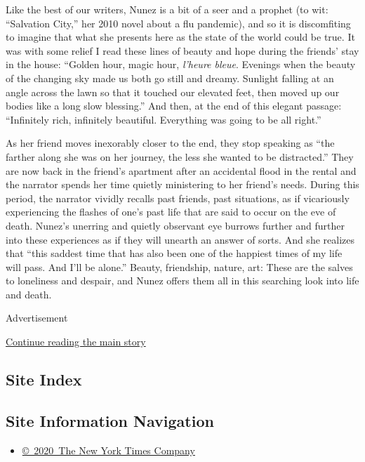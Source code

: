 Like the best of our writers, Nunez is a bit of a seer and a prophet (to
wit: ``Salvation City,'' her 2010 novel about a flu pandemic), and so it
is discomfiting to imagine that what she presents here as the state of
the world could be true. It was with some relief I read these lines of
beauty and hope during the friends' stay in the house: ``Golden hour,
magic hour, \emph{l'heure bleue}. Evenings when the beauty of the
changing sky made us both go still and dreamy. Sunlight falling at an
angle across the lawn so that it touched our elevated feet, then moved
up our bodies like a long slow blessing.'' And then, at the end of this
elegant passage: ``Infinitely rich, infinitely beautiful. Everything was
going to be all right.''

As her friend moves inexorably closer to the end, they stop speaking as
``the farther along she was on her journey, the less she wanted to be
distracted.'' They are now back in the friend's apartment after an
accidental flood in the rental and the narrator spends her time quietly
ministering to her friend's needs. During this period, the narrator
vividly recalls past friends, past situations, as if vicariously
experiencing the flashes of one's past life that are said to occur on
the eve of death. Nunez's unerring and quietly observant eye burrows
further and further into these experiences as if they will unearth an
answer of sorts. And she realizes that ``this saddest time that has also
been one of the happiest times of my life will pass. And I'll be
alone.'' Beauty, friendship, nature, art: These are the salves to
loneliness and despair, and Nunez offers them all in this searching look
into life and death.

Advertisement

\protect\hyperlink{after-bottom}{Continue reading the main story}

\hypertarget{site-index}{%
\subsection{Site Index}\label{site-index}}

\hypertarget{site-information-navigation}{%
\subsection{Site Information
Navigation}\label{site-information-navigation}}

\begin{itemize}
\tightlist
\item
  \href{https://help.nytimes3xbfgragh.onion/hc/en-us/articles/115014792127-Copyright-notice}{©~2020~The
  New York Times Company}
\end{itemize}

